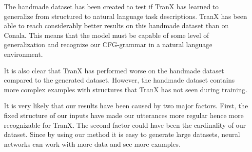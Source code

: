 The handmade dataset has been created to test if TranX has learned to generalize
from structured to natural language task descriptions. TranX has been able to
reach considerably better results on this handmade dataset than on Conala. This
means that the model must be capable of some level of generalization and
recognize our CFG-grammar in a natural language environment.

It is also clear that TranX has performed worse on the handmade dataset compared
to the generated dataset. However, the handmade dataset contains more complex
examples with structures that TranX has not seen during training.

It is very likely that our results have been caused by two major factors. First,
the fixed structure of our inputs have made our utterances more regular hence
more recognizable for TranX. The second factor could have been the cardinality
of our dataset. Since by using our method it is easy to generate large datasets,
neural networks can work with more data and see more examples.